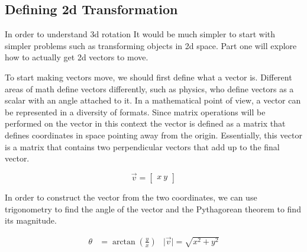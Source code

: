 \subsection{Defining 2d Transformation}
\hspace{\parindent}%
In order to understand 3d rotation It would be much simpler to start with simpler problems such as transforming objects in 2d space. Part one will explore how to actually get 2d vectors to move.

To start making vectors move, we should first define what a vector is. Different areas of math define vectors differently, such as physics, who define vectors as a scalar with an angle attached to it. In a mathematical point of view, a vector can be represented in a diversity of formats. Since matrix operations will be performed on the vector in this context the vector is defined as a matrix that defines coordinates in space pointing away from the origin. Essentially, this vector is a matrix that contains two perpendicular vectors that add up to the final vector.

\begin{equation} \vec{v} = \begin{bmatrix} x \ y \end{bmatrix} \end{equation}


In order to construct the vector from the two coordinates, we can use trigonometry to find the angle of the vector and the Pythagorean theorem to find its magnitude.

\begin{align} \theta &= \arctan\left(\frac{y}{x}\right) & \lvert \vec{v} \rvert = \sqrt{x^2 + y^2} \end{align}




